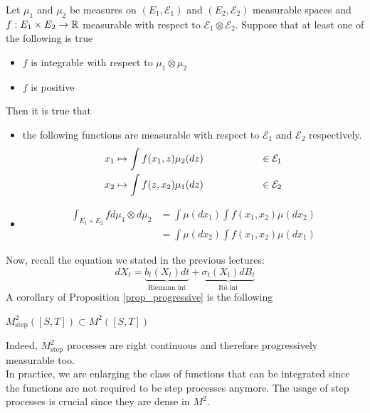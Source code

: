 \begin{ThBox}
    \begin{Th}
    Let $\mu_1$ and $\mu_2$ be measures on $(E_1, \mathcal{E}_1)$ and $(E_2, \mathcal{E}_2)$ measurable spaces and $f: E_1 \times E_2 \to \mathbb{R}$ measurable with respect to $\mathcal{E}_1 \otimes \mathcal{E}_2$. Suppose that at least one of the following is true 
    \begin{itemize}
        \item $f$ is integrable with respect to $\mu_1 \otimes \mu_2$
        \item $f$ is positive 
    \end{itemize}
    Then it is true that 
    \begin{itemize}
        \item the following functions are measurable with respect to $\mathcal{E}_1$ and $\mathcal{E}_2$ respectively. 
        \begin{equation*}
            \begin{split}
                x_1 \mapsto \int f(x_1,z) &\mu_2(dz) \hspace{2 cm} \in \mathcal{E}_1\\
                x_2 \mapsto \int f(z, x_2) &\mu_1(dz) \hspace{2 cm} \in \mathcal{E}_2
            \end{split}
        \end{equation*}
        \item \begin{align*}
            \int _{E_1 \times E_2} f d\mu_1 \otimes d\mu_2 &= \int \mu(dx_1) \int f(x_1, x_2) \mu(dx_2) \\
            &= \int \mu(dx_2) \int f(x_1, x_2) \mu(dx_1)
        \end{align*}
    \end{itemize}
\end{Th}
\end{ThBox}
Now, recall the equation we stated in the previous lectures:
\begin{equation*}
    dX_t = \underbrace{b_t(X_t) dt}_{\text{Riemann int}} + \underbrace{\sigma_t(X_t) dB_t }_{\text{Itô int}} 
\end{equation*}
A corollary of Proposition \ref{prop_progressive} is the following
\begin{Cor}
    $M^2_{\text{step}}([S,T]) \subset M^2([S,T])$ 
\end{Cor}
Indeed, $M^2_{\text{step}}$ processes are right continuous and therefore progressively measurable too. \\
In practice, we are enlarging the class of functions that can be integrated since the functions are not required to be step processes anymore. The usage of step processes is crucial since they are dense in $M^2$.

